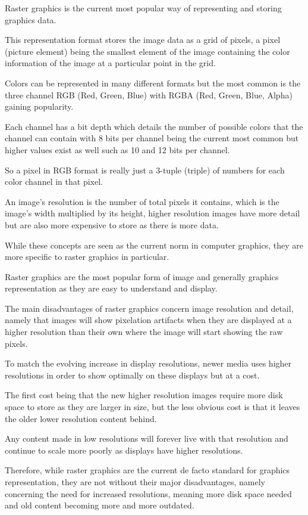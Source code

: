 \documentclass[12pt]{article}
\newcommand{\sentence}{} %
\begin{document}
    \tab
    Raster graphics is the current most popular way of representing and storing graphics data.
    \sentence
    This representation format stores the image data as a grid of pixels, a pixel (picture element) being the
    smallest element of the image containing the color information of the image at a particular point in the grid.
    \sentence
    Colors can be represented in many different formats but the most common is the three channel RGB (Red, Green, Blue)
    with RGBA (Red, Green, Blue, Alpha) gaining popularity.
    \sentence
    Each channel has a bit depth which details the number of possible colors that the channel can contain with 8 bits
    per channel being the current most common but higher values exist as well such as 10 and 12 bits per channel.
    \sentence
    So a pixel in RGB format is really just a 3-tuple (triple) of numbers for each color channel in that pixel.
    \sentence
    An image's resolution is the number of total pixels it contains, which is the image's width multiplied by its
    height, higher resolution images have more detail but are also more expensive to store as there is more data.
    \sentence
    While these concepts are seen as the current norm in computer graphics, they are more specific to raster graphics
    in particular.
    \sentence

    \bigskip
    Raster graphics are the most popular form of image and generally graphics representation as they are easy to
    understand and display.
    \sentence
    The main disadvantages of raster graphics concern image resolution and detail, namely that images will show
    pixelation artifacts when they are displayed at a higher resolution than their own where the image will start
    showing the raw pixels.
    \sentence
    To match the evolving increase in display resolutions, newer media uses higher resolutions in order to show
    optimally on these displays but at a cost.
    \sentence
    The first cost being that the new higher resolution images require more disk space to store as they are larger in
    size, but the less obvious cost is that it leaves the older lower resolution content behind.
    \sentence
    Any content made in low resolutions will forever live with that resolution and continue to scale more poorly as
    displays have higher resolutions.
    \sentence
    Therefore, while raster graphics are the current de facto standard for graphics representation, they are not
    without their major disadvantages, namely concerning the need for increased resolutions, meaning more disk space
    needed and old content becoming more and more outdated.
\end{document}
